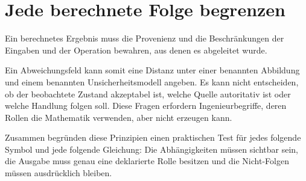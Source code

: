 \section{Jede berechnete Folge begrenzen}

\begin{principle}
\label{princ:derived-result-discipline}
Ein berechnetes Ergebnis muss die Provenienz und die Beschränkungen der
Eingaben und der Operation bewahren, aus denen es abgeleitet wurde.
\end{principle}

Ein Abweichungsfeld kann somit eine Distanz unter einer benannten Abbildung
und einem benannten Unsicherheitsmodell angeben. Es kann nicht entscheiden, ob
der beobachtete Zustand akzeptabel ist, welche Quelle autoritativ ist oder
welche Handlung folgen soll. Diese Fragen erfordern Ingenieurbegriffe, deren
Rollen die Mathematik verwenden, aber nicht erzeugen kann.

Zusammen begründen diese Prinzipien einen praktischen Test für jedes folgende
Symbol und jede folgende Gleichung: Die Abhängigkeiten müssen sichtbar sein,
die Ausgabe muss genau eine deklarierte Rolle besitzen und die Nicht-Folgen
müssen ausdrücklich bleiben.
